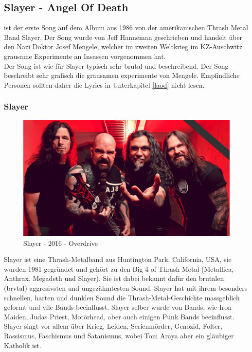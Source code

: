 \documentclass[twocolumn,10pt]{article}
\begin{document}
		\subsection{Slayer - Angel Of Death}
			 ist der erste Song auf dem Album  aus 1986 von der amerikanischen Thrash Metal Band Slayer. Der Song wurde von Jeff Hanneman geschrieben und handelt über den Nazi Doktor Josef Mengele, welcher im zweiten Weltkrieg im KZ-Auschwitz grausame Experimente an Insassen vorgenommen hat.\\
			Der Song ist wie für Slayer typisch sehr brutal und beschreibend. Der Song beschreibt sehr grafisch die grausamen experimente von Mengele. Empfindliche Personen sollten daher die Lyrics in Unterkapitel \autoref{laod} nicht lesen.
			\subsubsection{Slayer}
			\begin{figure}[H]
				\includegraphics[width=\linewidth]{slayer-2016}
				\caption{Slayer - 2016 - Overdrive\cite{overdrive_2018}}
			\end{figure}
			Slayer ist eine Thrash-Metalband aus Huntington Park, California, USA, sie wurden 1981 gegründet und gehört zu den Big 4 of Thrash Metal (Metallica, Anthrax, Megadeth und Slayer). Sie ist dabei bekannt dafür den brutalen (brvtal) aggresivsten und ungezähmtesten Sound. Slayer hat mit ihrem besonders schnellen, harten und dunklen Sound die Thrash-Metal-Geschichte massgeblich geformt und vile Bands beeinflusst. Slayer selber wurde von Bands, wie Iron Maiden, Judas Priest, Motörhead, aber auch einigen Punk Bands beeinflusst.\\
			Slayer singt vor allem über Krieg, Leiden, Serienmörder, Genozid, Folter, Rassismus, Faschismus und Satanismus, wobei Tom Araya aber ein gläubiger Katholik ist.\\
\end{document}
